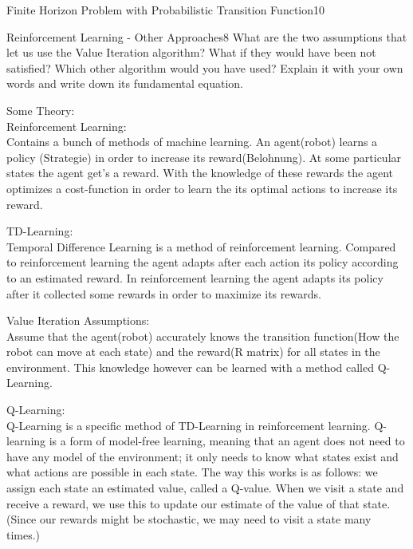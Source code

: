 \begin{questions}
\begin{question}{Finite Horizon Problem with Probabilistic Transition Function}{10}
\begin{answer}
\end{answer}


\end{question}



\begin{question}[bonus]{Reinforcement Learning - Other Approaches}{8}
What are the two assumptions that let us use the Value Iteration algorithm? What if they would have been not satisfied? Which other algorithm would you have used? Explain it with your own words and write down its fundamental equation.

\begin{answer}
Some Theory:\\
Reinforcement Learning:\\
Contains a bunch of methods of machine learning. An agent(robot) learns a policy (Strategie) in order to increase its reward(Belohnung). At some particular states the agent get's a reward. With the knowledge of these rewards the agent optimizes a cost-function in order to learn the its optimal actions to increase its reward.

TD-Learning:\\
Temporal Difference Learning is a method of reinforcement learning. Compared to reinforcement learning the agent adapts after each action its policy according to an estimated reward. In reinforcement learning the agent adapts its policy after it collected some rewards in order to maximize its rewards. 


Value Iteration Assumptions:\\
Assume that the agent(robot) accurately knows the transition function(How the robot can move at each state) and the reward(R matrix) for all states in the environment. This knowledge however can be learned with a method called Q-Learning.

Q-Learning:\\
Q-Learning is a specific method of TD-Learning in reinforcement learning. 
Q-learning is a form of model-free learning, meaning that an agent does not need to have any model of the environment; it only needs to know what states exist and what actions are possible in each state.
The way this works is as follows: we assign each state an estimated value, called a Q-value. When we visit a state and receive a reward, we use this to update our estimate of the value of that state. (Since our rewards might be stochastic, we may need to visit a state many times.)


\end{answer}
\end{question}
\end{questions}
